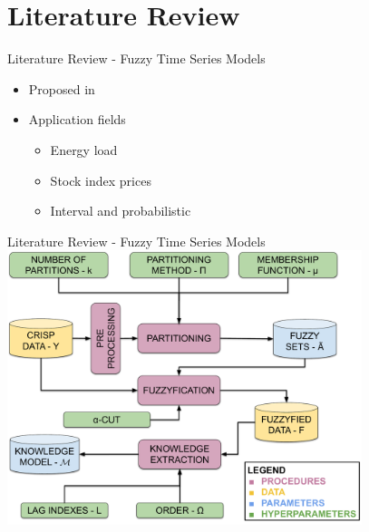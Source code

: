 \documentclass{beamer}
\begin{document}

\section{Literature Review}


\begin{frame}{Literature Review - Fuzzy Time Series Models}

\begin{itemize}
\item Proposed in \cite{song1993fuzzy}
\item Application fields
\begin{itemize}
\item Energy load  \cite{Sadaei2017, Severiano2017a, Silva2017a, Silva2018a}
\item Stock index prices \cite{Sadaei2016, Silva2016ifts,Talarposhti2016a}
\item Interval and probabilistic \cite{Silva2016ifts, Alves2018}
\end{itemize}
\end{itemize}
\end{frame}

\note[itemize]{
\item 
}


\begin{frame}{Literature Review - Fuzzy Time Series Models}
\includegraphics[width=\textwidth,height=8cm]{figures/fts_training.pdf}
\end{frame}
\end{document}
